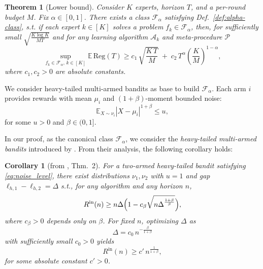 \documentclass[a4paper,14pt]{extarticle}
\theoremstyle{plain}
\newtheorem{theorem}{Theorem}
\newtheorem{corollary}{Corollary}
\begin{document}
\begin{theorem}[Lower bound]
\label{thm:mt-alpha_appendix}
Consider $K$ experts, horizon $T$, and a per-round budget $M$. Fix $\alpha\in[0,1]$. There exists a class $\mathcal F_\alpha$ satisfying Def.~\ref{def:alpha-class}, s.t. if each
expert $k \in [K]$ solves a problem $f_k \in \mathcal F_\alpha$, then, for sufficiently small $\sqrt{\frac{K\log K}{MT}}$ and for any learning algorithm $\mathscr{A}_k$ and meta-procedure $\mathcal{P}$
\begin{equation}
\label{eq:mt-alpha-internal}
\sup_{f_{k} \in \mathcal{F}_{\alpha},\,k \in [K]} \mathbb{E}\,\mathrm{Reg}(T) \ge c_1\,\sqrt{\frac{K\,T}{M}}
\;+\; c_2\,T^\alpha \left(\frac{K}{M} \right)^{1-\alpha},
\end{equation}
where $c_1,c_2>0$ are absolute constants.
\end{theorem}

We consider heavy-tailed multi-armed bandits \cite{bubeck2013bandits} as base to build $\mathcal{F}_{\alpha}$.
Each arm $i$ provides rewards with mean $\mu_i$ and $(1+\beta)$-moment bounded noise:
\begin{equation}
\label{eq:noise_level}
    \mathbb{E}_{X\sim \nu_i} |X - \mu_i|^{1 + \beta}\leq u,
\end{equation}
for some $u>0$ and $\beta\in(0,1]$.

In our proof, as the canonical class $\mathcal{F}_\alpha$, we consider the \emph{heavy-tailed multi-armed bandits} introduced by \cite{bubeck2013bandits}.
From their analysis, the following corollary holds:

\begin{corollary}[from \cite{bubeck2013bandits}, Thm.~2]
\label{cor:heavy-tail-lb}
For a two-armed heavy-tailed bandit satisfying \eqref{eq:noise_level}, there exist distributions $\nu_1,\nu_2$ with $u=1$ and gap $\ell_{h, 1}-\ell_{h, 2}=\Delta$ s.t., for any algorithm and any horizon $n$,
\begin{equation}
\label{eq:heavy-lb-general}
R^{\text{in}}(n) \ge n\Delta\Bigl(1 - c_\beta \sqrt{n\Delta^{\frac{1+\beta}{\beta}}}\Bigr),
\end{equation}
where $c_\beta>0$ depends only on $\beta$.
For fixed $n$, optimizing $\Delta$ as
\begin{equation}
\label{eq:heavy-lb-opt}
\Delta = c_0\, n^{-\frac{\beta}{1+\beta}}
\end{equation}
with sufficiently small $c_0>0$ yields
\begin{equation}
\label{eq:heavy-lb-final}
R^{\text{in}}(n) \ge c'\,n^{\frac{1}{1+\beta}},
\end{equation}
for some absolute constant $c'>0$.
\end{corollary}
\end{document}
